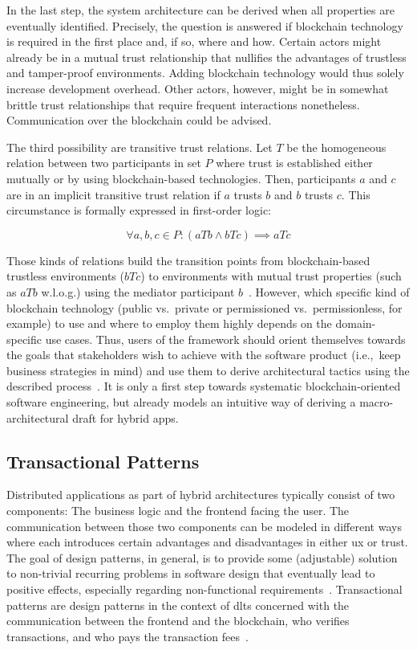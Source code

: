 In the last step, the system architecture can be derived when all properties are eventually identified. Precisely, the question is answered if blockchain technology is required in the first place and, if so, where and how. Certain actors might already be in a mutual trust relationship that nullifies the advantages of trustless and tamper-proof environments. Adding blockchain technology would thus solely increase development overhead. Other actors, however, might be in somewhat brittle trust relationships that require frequent interactions nonetheless. Communication over the blockchain could be advised.

The third possibility are transitive trust relations. Let $T$ be the homogeneous relation between two participants in set $P$ where trust is established either mutually or by using blockchain-based technologies. Then, participants $a$ and $c$ are in an implicit transitive trust relation if $a$ trusts $b$ and $b$ trusts $c$. This circumstance is formally expressed in first-order logic:

\begin{equation}
\forall a,b,c \in P : (aTb \land bTc) \implies aTc
\end{equation}

Those kinds of relations build the transition points from blockchain-based trustless environments ($bTc$) to environments with mutual trust properties (such as $aTb$ w.l.o.g.) using the mediator participant $b$~\cite{how_much_blockchain_do_you_need}. However, which specific kind of blockchain technology (public vs.\ private or permissioned vs.\ permissionless, for example) to use and where to employ them highly depends on the domain-specific use cases. Thus, users of the framework should orient themselves towards the goals that stakeholders wish to achieve with the software product (i.e.,\ keep business strategies in mind) and use them to derive architectural tactics using the described process~\cite{building_hybrid_dapps_using_blockchain_tactics}. It is only a first step towards systematic blockchain-oriented software engineering, but already models an intuitive way of deriving a macro-architectural draft for hybrid apps.


\subsection{Transactional Patterns}
Distributed applications as part of hybrid architectures typically consist of two components: The business logic and the frontend facing the user. The communication between those two components can be modeled in different ways where each introduces certain advantages and disadvantages in either \gls{ux} or trust. The goal of design patterns, in general, is to provide some (adjustable) solution to non-trivial recurring problems in software design that eventually lead to positive effects, especially regarding non-functional requirements~\cite{design_patterns,security_patterns_in_ethereum}. Transactional patterns are design patterns in the context of \glspl{dlt} concerned with the communication between the frontend and the blockchain, who verifies transactions, and who pays the transaction fees~\cite{engineering_software_architectures_of_BO_Apps}.

